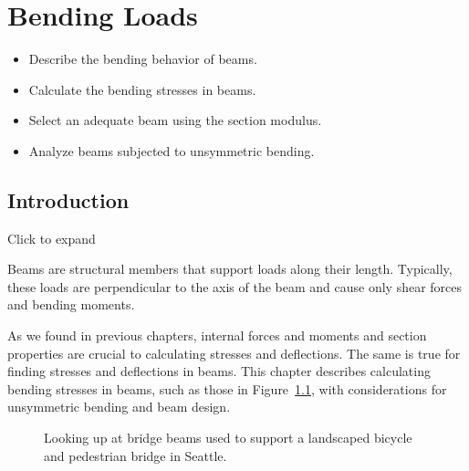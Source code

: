 \documentclass[
  letterpaper,
  DIV=11,
  numbers=noendperiod]{scrreprt}
\providecommand{\tightlist}{%
  \setlength{\itemsep}{0pt}\setlength{\parskip}{0pt}}\usepackage{longtable,booktabs,array}
\theoremstyle{definition}
\theoremstyle{remark}
\begin{document}

\chapter{Bending Loads}\label{sec-bending-loads}

\begin{tcolorbox}[enhanced jigsaw, colback=white, colframe=quarto-callout-note-color-frame, toptitle=1mm, arc=.35mm, bottomrule=.15mm, toprule=.15mm, opacitybacktitle=0.6, title={Learning Objectives}, coltitle=black, breakable, colbacktitle=quarto-callout-note-color!10!white, bottomtitle=1mm, titlerule=0mm, opacityback=0, leftrule=.75mm, left=2mm, rightrule=.15mm]

\begin{itemize}
\tightlist
\item
  Describe the bending behavior of beams.
\item
  Calculate the bending stresses in beams.
\item
  Select an adequate beam using the section modulus.
\item
  Analyze beams subjected to unsymmetric bending.
\end{itemize}

\end{tcolorbox}

\section*{Introduction}\label{introduction-8}


Click to expand

Beams are structural members that support loads along their length.
Typically, these loads are perpendicular to the axis of the beam and
cause only shear forces and bending moments.\,

As we found in previous chapters, internal forces and moments and
section properties are crucial to calculating stresses and deflections.
The same is true for finding stresses and deflections in beams. This
chapter describes calculating bending stresses in beams, such as those
in Figure~\ref{fig-9.1}, with considerations for unsymmetric bending and
beam design.

\begin{figure}


\caption{\label{fig-9.1}Looking up at bridge beams used to support a
landscaped bicycle and pedestrian bridge in Seattle.}

\end{figure}%
\end{document}

